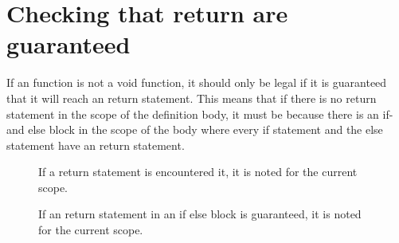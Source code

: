 \section{Checking that return are guaranteed}
If an function is not a void function, it should only be legal if it is guaranteed that it will reach an return statement. This means that if there is no return statement in the scope of the definition body, it must be because there is an if- and else block in the scope of the body where every if statement and the else statement have an return statement. 

\begin{figure}[H]
\centering
{}
\caption{If a return statement is encountered it, it is noted for the current scope.}
\label{lf05}
\end{figure}

\begin{figure}[H]
\centering
{}
\caption{If an return statement in an if else block is guaranteed, it is noted for the current scope.} 
\label{lf05}
\end{figure}

